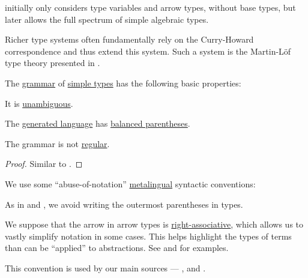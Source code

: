 \begin{concept}
\begin{thmenum}
     initially only considers type variables and arrow types, without base types, but later allows the full spectrum of simple algebraic types.

    Richer type systems often fundamentally rely on the Curry-Howard correspondence and thus extend this system. Such a system is the Martin-L\"of type theory presented in .
  \end{thmenum}
\end{concept}

\begin{proposition}\label{thm:simple_type_grammar}
  The \hyperref[def:formal_grammar]{grammar} of \hyperref[def:simple_type]{simple types} has the following basic properties:
  \begin{thmenum}
     It is \hyperref[def:grammar_ambiguity]{unambiguous}.

     The \hyperref[def:formal_grammar/language]{generated language} has \hyperref[def:paired_delimiters]{balanced parentheses}.

     The grammar is not \hyperref[def:chomsky_hierarchy/regular]{regular}.
  \end{thmenum}
\end{proposition}
\begin{proof}
  Similar to .
\end{proof}

\begin{remark}\label{rem:simple_type_parentheses}
  We use some \enquote{abuse-of-notation} \hyperref[con:metalogic]{metalingual} syntactic conventions:
  \begin{thmenum}
     As in  and , we avoid writing the outermost parentheses in types.

     We suppose that the arrow in arrow types is \hyperref[rem:binary_operation_syntax_trees/associativity]{right-associative}, which allows us to vastly simplify notation in some cases. This helps highlight the types of terms than can be \enquote{applied} to abstractions. See  and  for examples.

    This convention is used by our main sources --- ,  and .
  \end{thmenum}
\end{remark}

